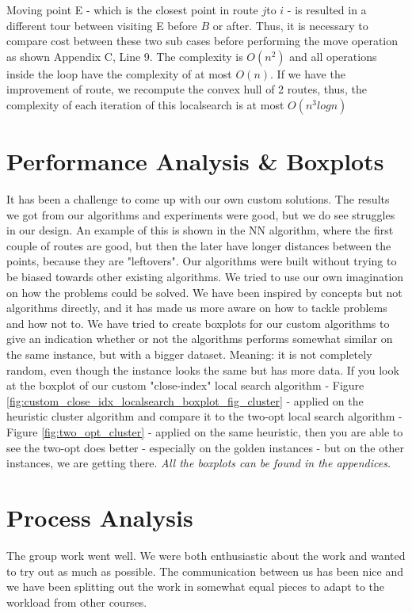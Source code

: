 \documentclass[12pt]{article}
\begin{document}
Moving point E - which is the closest point in route \(j\)to \(i\) - is resulted in a different tour between visiting E before \(B\) or after. Thus, it is necessary to compare cost between these two sub cases before performing the move operation as shown Appendix C, Line 9. The complexity is $O(n^2)$ and all operations inside the loop have the complexity of at most $O(n)$. If we have the improvement of route, we recompute the convex hull of 2 routes, thus, the complexity of each iteration of this localsearch is at most $O(n^3logn)$

\section{Performance Analysis \& Boxplots}
It has been a challenge to come up with our own custom solutions. The results we got from our algorithms and experiments
were good, but we do see struggles in our design. An example of this is shown in the NN algorithm, where the first couple of routes are good, but then the later have longer distances between the points, because they are "leftovers". 
\newline
Our algorithms were built without trying to be biased towards other existing algorithms. We tried to use our own imagination on how the problems could be solved. 
We have been inspired by concepts but not algorithms directly, and it has made us more aware on how to tackle problems and how not to.
\newline
We have tried to create boxplots for our custom algorithms to give an indication whether or not the algorithms performs somewhat similar on the same instance, but with 
a bigger dataset. Meaning: it is not completely random, even though the instance looks the same but has more data. If you look at the boxplot of our custom "close-index" local search algorithm - Figure \ref{fig:custom_close_idx_localsearch_boxplot_fig_cluster} - applied on the heuristic cluster algorithm
and compare it to the two-opt local search algorithm - Figure \ref{fig:two_opt_cluster} - applied on the same heuristic, then you are able to see the two-opt does better - especially on the golden instances - but on the other instances, we are getting there. 
\newline 
\textit{All the boxplots can be found in the appendices.}
\newline



\section{Process Analysis}
The group work went well. We were both enthusiastic about the work and wanted to try out as much as possible. 
The communication between us has been nice and we have been splitting out the work in somewhat equal pieces to adapt to the workload from other courses.
\end{document}
